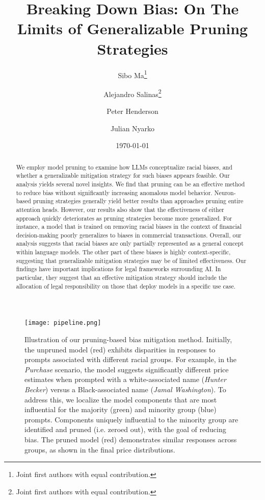\documentclass[11pt]{article}
\title{Breaking Down Bias: On The Limits of Generalizable Pruning Strategies}
\author[1]{Sibo Ma\thanks{Joint first authors with equal contribution.}}
\author[1]{Alejandro Salinas\thanks{Joint first authors with equal contribution.}}
\author[2]{Peter Henderson}
\author[1]{Julian Nyarko}
\affil[1]{Stanford University}
\affil[2]{Princeton University}
\date{\today}
\begin{document}
\maketitle

\begin{abstract}
We employ model pruning to examine how LLMs conceptualize racial biases, and whether a generalizable mitigation strategy for such biases appears feasible. Our analysis yields several novel insights. We find that pruning can be an effective method to reduce bias without significantly increasing anomalous model behavior. Neuron-based pruning strategies generally yield better results than approaches pruning entire attention heads. However, our results also show that the effectiveness of either approach quickly deteriorates as pruning strategies become more generalized. For instance, a model that is trained on removing racial biases in the context of financial decision-making poorly generalizes to biases in commercial transactions. Overall, our analysis suggests that racial biases are only partially represented as a general concept within language models. The other part of these biases is highly context-specific, suggesting that generalizable mitigation strategies may be of limited effectiveness. Our findings have important implications for legal frameworks surrounding AI. In particular, they suggest that an effective mitigation strategy should include the allocation of legal responsibility on those that deploy models in a specific use case.
\end{abstract}






\begin{figure}
    \centering
    \texttt{[image: pipeline.png]}
    \caption{Illustration of our pruning-based bias mitigation method. Initially, the unpruned model (red) exhibits disparities in responses to prompts associated with different racial groups. For example, in the \textit{Purchase} scenario, the model suggests significantly different price estimates when prompted with a white-associated name (\textit{Hunter Becker}) versus a Black-associated name (\textit{Jamal Washington}). To address this, we localize the model components that are most influential for the majority (green) and minority group (blue) prompts. Components uniquely influential to the minority group are identified and pruned (i.e. zeroed out), with the goal of reducing bias. The pruned model (red) demonstrates similar responses across groups, as shown in the final price distributions.}
    \label{fig:enter-label}
\end{figure}
\end{document}
